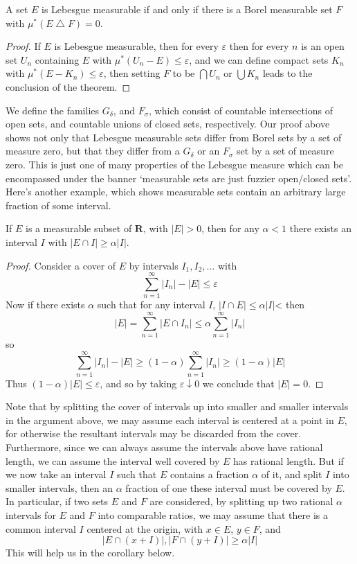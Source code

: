 \begin{theorem}
  A set $E$ is Lebesgue measurable if and only if there is a Borel measurable set $F$ with $\mu^*(E \bigtriangleup F) = 0$.
\end{theorem}
\begin{proof}
  If $E$ is Lebesgue measurable, then for every $\varepsilon$ then for every $n$ is an open set $U_n$ containing $E$ with $\mu^*(U_n - E) \leq \varepsilon$, and we can define compact sets $K_n$ with $\mu^*(E - K_n) \leq \varepsilon$, then setting $F$ to be $\bigcap U_n$ or $\bigcup K_n$ leads to the conclusion of the theorem.
\end{proof}

We define the families $G_\delta$, and $F_\sigma$, which consist of countable intersections of open sets, and countable unions of closed sets, respectively. Our proof above shows not only that Lebesgue measurable sets differ from Borel sets by a set of measure zero, but that they differ from a $G_\delta$ or an $F_\sigma$ set by a set of measure zero. This is just one of many properties of the Lebesgue measure which can be encompassed under the banner `measurable sets are just fuzzier open/closed sets'. Here's another example, which shows measurable sets contain an arbitrary large fraction of some interval.

\begin{theorem}
  If $E$ is a measurable subset of $\mathbf{R}$, with $|E| > 0$, then for any $\alpha < 1$ there exists an interval $I$ with $|E \cap I| \geq \alpha |I|$.
\end{theorem}
\begin{proof}
  Consider a cover of $E$ by intervals $I_1, I_2, \dots$ with
  \[ \sum_{n = 1}^\infty |I_n| - |E| \leq \varepsilon \]
  Now if there exists $\alpha$ such that for any interval $I$, $|I \cap E| \leq \alpha |I|$< then
  \[ |E| = \sum_{n = 1}^\infty |E \cap I_n| \leq \alpha \sum_{n = 1}^\infty |I_n| \]
  so
  \[ \sum_{n = 1}^\infty |I_n| - |E| \geq (1 - \alpha) \sum_{n = 1}^\infty |I_n| \geq (1 - \alpha) |E| \]
  Thus $(1 - \alpha) |E| \leq \varepsilon$, and so by taking $\varepsilon \downarrow 0$ we conclude that $|E| = 0$.
\end{proof}

Note that by splitting the cover of intervals up into smaller and smaller intervals in the argument above, we may assume each interval is centered at a point in $E$, for otherwise the resultant intervals may be discarded from the cover. Furthermore, since we can always assume the intervals above have rational length, we can assume the interval well covered by $E$ has rational length. But if we now take an interval $I$ such that $E$ contains a fraction $\alpha$ of it, and split $I$ into smaller intervals, then an $\alpha$ fraction of one these interval must be covered by $E$. In particular, if two sets $E$ and $F$ are considered, by splitting up two rational $\alpha$ intervals for $E$ and $F$ into comparable ratios, we may assume that there is a common interval $I$ centered at the origin, with $x \in E$, $y \in F$, and
%
\[| E \cap (x + I)|, |F \cap (y + I)| \geq \alpha |I| \]
%
This will help us in the corollary below.

